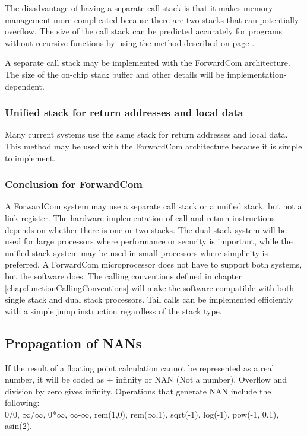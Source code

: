 \documentclass[forwardcom.tex]{subfiles}
\begin{document}
The disadvantage of having a separate call stack is that it makes memory management more complicated because there are two stacks that can potentially overflow. The size of the call stack can be predicted accurately for programs without recursive functions by using the method described on page \pageref{predictingStackSize}.
\vspace{2mm}

A separate call stack may be implemented with the ForwardCom architecture. The size of the on-chip stack buffer and other details will be implementation-dependent.

\subsubsection{Unified stack for return addresses and local data} \label{singleStack}
Many current systems use the same stack for return addresses and local data. This method may be used with the ForwardCom architecture because it is simple to implement. 
\vspace{2mm}

\subsubsection{Conclusion for ForwardCom}
A ForwardCom system may use a separate call stack or a unified stack, but not a link register. The hardware implementation of call and return instructions depends on whether there is one or two stacks. The dual stack system will be used for large processors where performance or security is important, while the unified stack system may be used in small processors where simplicity is preferred. A ForwardCom microprocessor does not have to support both systems, but the software does. 
The calling conventions defined in chapter \ref{chap:functionCallingConventions} will make the software compatible with both single stack and dual stack processors.
Tail calls can be implemented efficiently with a simple jump instruction regardless of the stack type.
\vspace{2mm}


\subsection{Propagation of NANs}
\label{nanPropagation}
If the result of a floating point calculation cannot be represented as a real number, it will be coded as $\pm$ infinity or NAN (Not a number). Overflow and division by zero gives infinity.
Operations that generate NAN include the following:\\
0/0, $\infty$/$\infty$, 0*$\infty$, $\infty$-$\infty$, rem(1,0), rem($\infty$,1), sqrt(-1), log(-1), pow(-1, 0.1), asin(2).
\vspace{2mm}
\end{document}
